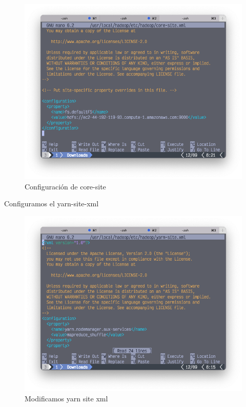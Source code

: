 \clearpage
\begin{figure}[h]
	\centering
	\includegraphics[scale=.35] {img/35-core-site-xml}
	\caption{Configuración de core-site }
	\label{fig:35}	
\end{figure}


Configuramos el yarn-site-xml

\begin{figure}[h]
	\centering
	\includegraphics[scale=.35] {img/36-yarn-site-xml}
	\caption{Modificamos yarn site xml}
	\label{fig:36}	
\end{figure}

